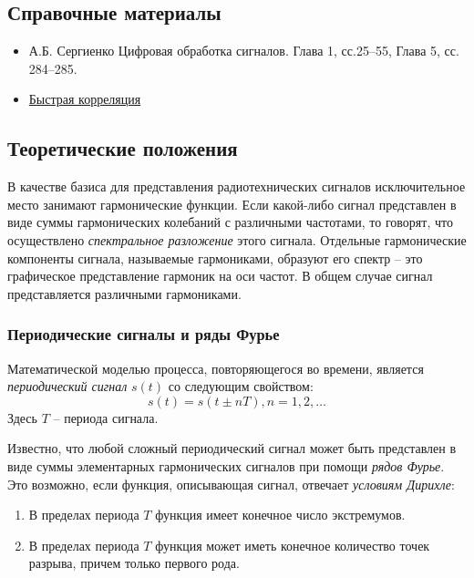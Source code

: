 \documentclass[12pt,a4paper]{article}
\begin{document}
\subsection{Справочные материалы}

\begin{itemize}
\item А.Б. Сергиенко Цифровая обработка сигналов. Глава 1, сс.25–55, Глава 5, сс. 284–285.
\item \href{http://www.williamspublishing.com/PDF/5-8459-0710-1/part.pdf}{Быстрая корреляция}
\end{itemize}

\subsection{Теоретические положения}

В качестве базиса для представления радиотехнических сигналов исключительное место занимают гармонические функции. Если какой-либо сигнал представлен в виде суммы гармонических колебаний с различными частотами, то говорят, что осуществлено \emph{спектральное разложение} этого сигнала. Отдельные гармонические компоненты сигнала, называемые гармониками, образуют его спектр -- это графическое представление гармоник на оси частот. В общем случае сигнал представляется различными гармониками.

\subsubsection{Периодические сигналы и ряды Фурье}

Математической моделью процесса, повторяющегося во времени, является \emph{периодический сигнал} $s(t)$ со следующим свойством:
\begin{equation}
\nonumber
s\left(t\right) = s\left(t\pm nT\right), n=1,2,\ldots
\end{equation}
Здесь $T$ -- периода сигнала.

Известно, что любой сложный периодический сигнал может быть представлен в виде суммы элементарных гармонических сигналов при помощи \emph{рядов Фурье}. Это возможно, если функция, описывающая сигнал, отвечает \emph{условиям Дирихле}:
\begin{enumerate}
\item В пределах периода $T$ функция имеет конечное число экстремумов.
\item В пределах периода $T$ функция может иметь конечное количество точек разрыва, причем только первого рода.
\end{enumerate}
\end{document}
